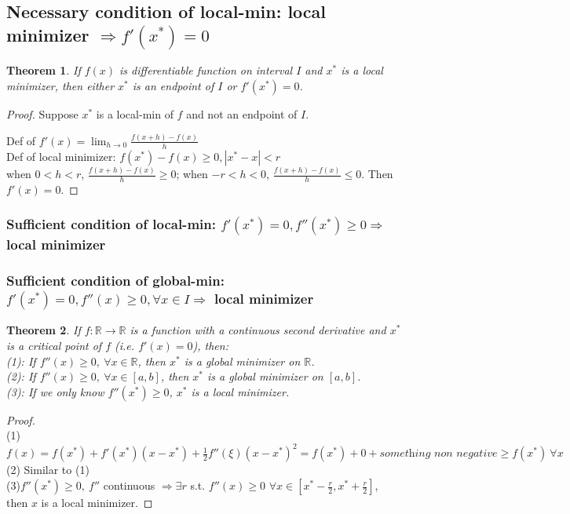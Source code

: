 \documentclass[11pt,a4paper]{article}
\newtheorem{theorem}{Theorem}
\begin{document}
\subsection*{Necessary condition of local-min: local minimizer $\Rightarrow f'(x^*)=0$}

\begin{theorem}
If $f(x)$ is differentiable function on interval $I$ and $x^*$ is a local minimizer, then either $x^*$ is an endpoint of $I$ or $f'(x^*)=0$.
\end{theorem}

\begin{proof}
Suppose $x^*$ is a local-min of $f$ and not an endpoint of $I$.

Def of $f'(x)=\lim_{h \rightarrow 0} \frac{f(x+h)-f(x)}{h}$\\
Def of local minimizer: $f(x^*)-f(x)\geq 0, |x^*-x|<r$\\
when $0<h<r$, $\frac{f(x+h)-f(x)}{h}\geq 0$; when $-r<h<0$, $\frac{f(x+h)-f(x)}{h}\leq 0$. Then $f'(x)=0$.
\end{proof}

\subsubsection*{Sufficient condition of local-min: $f'(x^*)=0, f''(x^*)\geq 0 \Rightarrow$ local minimizer}

\subsubsection*{Sufficient condition of global-min: $f'(x^*)=0, f''(x)\geq 0,\forall x\in I \Rightarrow$ local minimizer}
\begin{theorem}
    If $f:\mathbb{R} \rightarrow \mathbb{R}$ is a function with a continuous second derivative and $x^*$ is a critical point of $f$ (i.e. $f'(x)=0$), then:\\
    (1): If $f''(x)\geq 0,\ \forall x\in\mathbb{R}$, then $x^*$ is a global minimizer on $\mathbb{R}$.\\
    (2): If $f''(x)\geq 0,\ \forall x\in[a,b]$, then $x^*$ is a global minimizer on $[a,b]$.\\
    (3): If we only know $f''(x^*)\geq 0$, $x^*$ is a local minimizer.
\end{theorem}
\begin{proof}
\quad\\
(1)$f(x)=f(x^*)+f'(x^*)(x-x^*)+\frac{1}{2}f''(\xi)(x-x^*)^2=f(x^*)+0+\textit{something non negative}\geq f(x^*)\  \forall x$\\
(2) Similar to (1)\\
(3)$f''(x^*)\geq 0,\ f''$ continuous $\Rightarrow \exists r$ s.t. $f''(x)\geq 0$ $\forall x\in[x^*-\frac{r}{2},x^*+\frac{r}{2}]$, then $x$ is a local minimizer.
\end{proof}
\end{document}
